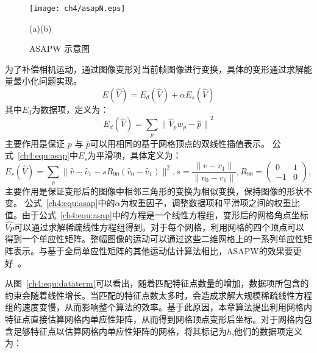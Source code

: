  \begin{figure}[!htbp]
\begin{center}
  \texttt{[image: ch4/asapN.eps]}
  \par \quad\quad\quad(a)\quad\quad\quad\quad\quad\quad\quad\quad\quad\quad\quad\quad(b)

\end{center}

\caption{ASAPW 示意图~\cite{Liu_2013ASAP}}
\label{ch4:fig:2}       %
\end{figure}
为了补偿相机运动，通过图像变形对当前帧图像进行变换，具体的变形通过求解能量最小化问题实现。
\begin{equation}\label{ch4:equ:asap}
  E(\hat{V}) = {E}_d(\hat{V}) + \alpha{E}_{s}(\hat{V})
\end{equation}
其中$E_d$为数据项，定义为：
\begin{equation}\label{ch4:equ:dataterm}
  {E}_{d}(\hat{V}) = \sum_{p}{\parallel\hat{V}_{p}{w}_{p}- \hat{p}\parallel}^{2}
\end{equation}
主要作用是保证 \(p\) 与 $\hat{p}$可以用相同的基于网格顶点的双线性插值表示。 公式~\ref{ch4:equ:asap}中$E_s$为平滑项，具体定义为：
$${E}_{s}(\hat{V} )= \sum_{\hat{v}}\parallel\hat{v}-\hat{v}_{1} - s{R}_{90}(\hat{v}_{0} - \hat{v}_{1})\parallel^{2}, s=\frac{\parallel{v}-{v}_{1}\parallel}{\parallel{v}_{0}-{v}_{1}\parallel},{R}_{90} = \left(\begin{array}{cc}{0} &{1} \\{-1} &{0}\end{array}\right),$$
主要作用是保证变形后的图像中相邻三角形的变换为相似变换，保持图像的形状不变。
公式~\ref{ch4:equ:asap}中的$\alpha$为权重因子，调整数据项和平滑项之间的权重比值。由于公式~\ref{ch4:equ:asap}中的方程是一个线性方程组，变形后的网格角点坐标$\hat{Vp}$可以通过求解稀疏线性方程组得到。对于每个网格，利用网格的四个顶点可以得到一个单应性矩阵。整幅图像的运动可以通过这些二维网格上的一系列单应性矩阵表示。与基于全局单应性矩阵的其他运动估计算法相比，ASAPW的效果要更好~\cite{Liu_2013ASAP}。 \par
从图~\ref{ch4:equ:dataterm}可以看出，随着匹配特征点数量的增加，数据项所包含的约束会随着线性增长。当匹配的特征点数太多时，会造成求解大规模稀疏线性方程组的速度变慢，从而影响整个算法的效率。基于此原因，本章算法提出利用网格内特征点直接估算网格内单应性矩阵，从而得到网格顶点变形后坐标。对于网格内包含足够特征点以估算网格内单应性矩阵的网格，将其标记为$h$,他们的数据项定义为：

